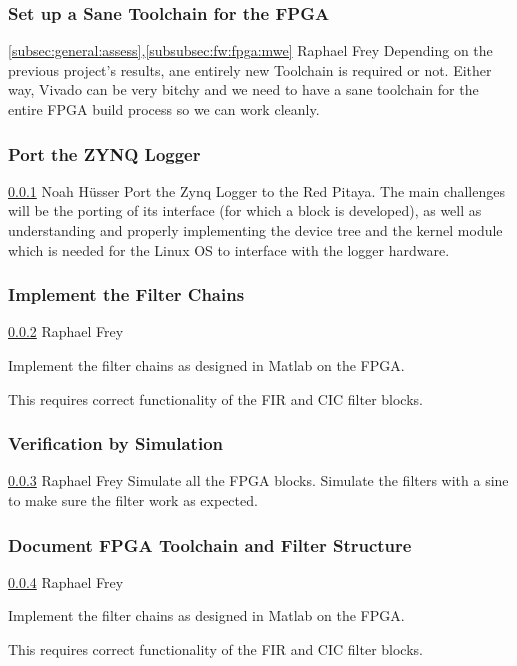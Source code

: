 \documentclass[a4paper,oneside]{alpenspecs/alpenspecs}
\begin{document}
\subsubsection{Set up a Sane Toolchain for the FPGA}
\label{subsubsec:fw:fpga:sane}

\wpac
    {}
    {}
    {}
    {\ref{subsec:general:assess},\ref{subsubsec:fw:fpga:mwe}}
    {}
    {Raphael Frey}
    {%
        Depending on the previous project's results, ane entirely new Toolchain is required or not. Either way, Vivado can be very bitchy and we need to have a sane toolchain for the entire FPGA build process so we can work cleanly.
    }

\subsubsection{Port the ZYNQ Logger}
\label{subsubsec:fw:fpga:logger}
\wpac
    {}
    {}
    {}
    {\ref{subsubsec:fw:fpga:sane}}
    {}
    {Noah H\"usser}
    {%
        Port the Zynq Logger to the Red Pitaya. The main challenges will be
        the porting of its interface (for which a block 
        is developed), as well as understanding and properly implementing the
        device tree and the kernel module which is needed for the Linux OS
        to interface with the logger hardware.
    }

\subsubsection{Implement the Filter Chains}
\label{subsubsec:fw:fpga:filters}
\wpac
    {}
    {}
    {}
    {\ref{subsubsec:fw:fpga:logger}}
    {}
    {Raphael Frey}
    {%
        Implement the filter chains as designed in Matlab on the FPGA.

        This requires correct functionality of the FIR and CIC filter
        blocks.
    }

\subsubsection{Verification by Simulation}
\label{subsubsec:fw:fpga:sim}
\wpac
    {}
    {}
    {}
    {\ref{subsubsec:fw:fpga:filters}}
    {}
    {Raphael Frey}
    {%
        Simulate all the FPGA blocks.
        Simulate the filters with a sine to make sure the filter work as expected.
    }

\subsubsection{Document FPGA Toolchain and Filter Structure}
\label{subsubsec:fw:fpga:doc}
\wpac
    {}
    {}
    {}
    {\ref{subsubsec:fw:fpga:sim}}
    {}
    {Raphael Frey}
    {%
        Implement the filter chains as designed in Matlab on the FPGA.

        This requires correct functionality of the FIR and CIC filter
        blocks.
    }
\end{document}
